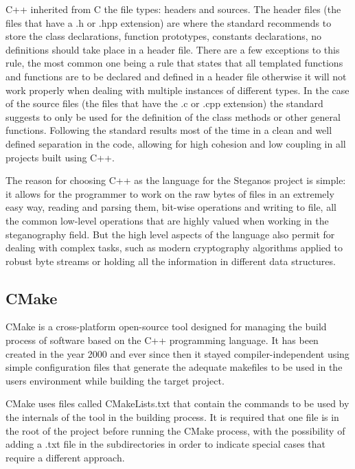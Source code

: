 \begin{multicols}{2}
C++ inherited from C the file types: headers and sources. The header files (the files that have a .h or .hpp extension) are where the standard recommends to store the class declarations, function prototypes, constants declarations, no definitions should take place in a header file. There are a few exceptions to this rule, the most common one being a rule that states that all templated functions and functions are to be declared and defined in a header file otherwise it will not work properly when dealing with multiple instances of different types. In the case of the source files (the files that have the .c or .cpp extension) the standard suggests to only be used for the definition of the class methods or other general functions. Following the standard results most of the time in a clean and well defined separation in the code, allowing for high cohesion and low coupling in all projects built using C++.

The reason for choosing C++ as the language for the Steganos project is simple: it allows for the programmer to work on the raw bytes of files in an extremely easy way, reading and parsing them, bit-wise operations and writing to file, all the common low-level operations that are highly valued when working in the steganography field. But the high level aspects of the language also permit for dealing with complex tasks, such as modern cryptography algorithms applied to robust byte streams or holding all the information in different data structures.

\subsection{CMake}
CMake is a cross-platform open-source tool designed for managing the build process of software based on the C++ programming language. It has been created in the year 2000 and ever since then it stayed compiler-independent using simple configuration files that generate the adequate makefiles to be used in the users environment while building the target project\cite{cmake}.

CMake uses files called CMakeLists.txt that contain the commands to be used by the internals of the tool in the building process. It is required that one file is in the root of the project before running the CMake process, with the possibility of adding a .txt file in the subdirectories in order to indicate special cases that require a different approach.


\end{multicols}
